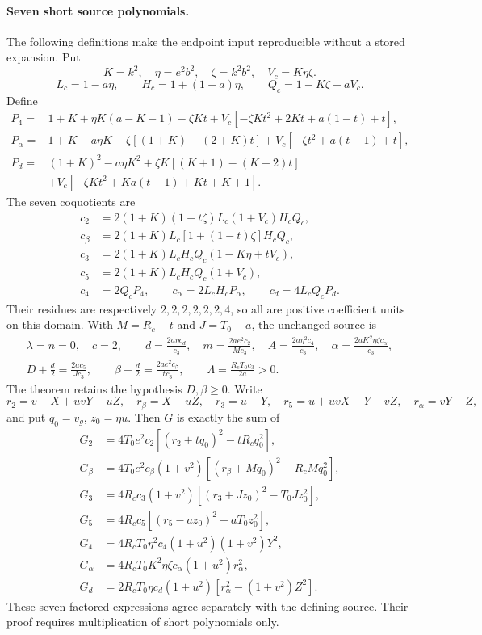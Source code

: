 \label{component:p7d4e5164e84a}
\paragraph{Seven short source polynomials.}
The following definitions make the endpoint input reproducible without a stored expansion. Put
\[
K=k^2,\quad \eta=e^2b^2,\quad\zeta=k^2b^2,\quad V_c=K\eta\zeta.
\]
\[
L_c=1-a\eta,\qquad H_c=1+(1-a)\eta,\qquad Q_c=1-K\zeta+aV_c.
\]
Define
\begin{align*}
P_4={}&1+K+\eta K(a-K-1)-\zeta Kt
 +V_c[-\zeta Kt^2+2Kt+a(1-t)+t],\\
P_\alpha={}&1+K-a\eta K+\zeta[(1+K)-(2+K)t]
 +V_c[-\zeta t^2+a(t-1)+t],\\
P_d={}&(1+K)^2-a\eta K^2+\zeta K[(K+1)-(K+2)t]\\
&+V_c[-\zeta Kt^2+Ka(t-1)+Kt+K+1].
\end{align*}
The seven coquotients are
\begin{align*}
c_2&=2(1+K)(1-t\zeta)L_c(1+V_c)H_cQ_c,\\
c_\beta&=2(1+K)L_c[1+(1-t)\zeta]H_cQ_c,\\
c_3&=2(1+K)L_cH_cQ_c(1-K\eta+tV_c),\\
c_5&=2(1+K)L_cH_cQ_c(1+V_c),\\
c_4&=2Q_cP_4,\qquad c_\alpha=2L_cH_cP_\alpha,
\qquad c_d=4L_cQ_cP_d.
\end{align*}
Their residues are respectively $2,2,2,2,2,2,4$, so all are positive coefficient units on this domain. With $M=R_c-t$ and $J=T_0-a$, the unchanged source is
\begin{gather*}
\lambda=n=0,\quad c=2,\qquad
d=\frac{2a\eta c_d}{c_3},\quad m=\frac{2ae^2c_2}{Mc_3},\quad
A=\frac{2a\eta^2c_4}{c_3},\quad
\alpha=\frac{2aK^2\eta\zeta c_\alpha}{c_3},\\
D+\frac d2=\frac{2ac_5}{Jc_3},\qquad
\beta+\frac d2=\frac{2ae^2c_\beta}{tc_3},\qquad
\Lambda=\frac{R_cT_0c_3}{2a}>0.
\end{gather*}
The theorem retains the hypothesis $D,\beta\ge0$. Write
\[
r_2=v-X+uvY-uZ,\quad r_\beta=X+uZ,\quad r_3=u-Y,
\quad r_5=u+uvX-Y-vZ,\quad r_\alpha=vY-Z,
\]
and put $q_0=v_g$, $z_0=\eta u$. Then $G$ is exactly the sum of
\begin{align*}
G_2&=4T_0e^2c_2[(r_2+tq_0)^2-tR_cq_0^2],\\
G_\beta&=4T_0e^2c_\beta(1+v^2)[(r_\beta+Mq_0)^2-R_cMq_0^2],\\
G_3&=4R_cc_3(1+v^2)[(r_3+Jz_0)^2-T_0Jz_0^2],\\
G_5&=4R_cc_5[(r_5-az_0)^2-aT_0z_0^2],\\
G_4&=4R_cT_0\eta^2c_4(1+u^2)(1+v^2)Y^2,\\
G_\alpha&=4R_cT_0K^2\eta\zeta c_\alpha(1+u^2)r_\alpha^2,\\
G_d&=2R_cT_0\eta c_d(1+u^2)[r_\alpha^2-(1+v^2)Z^2].
\end{align*}
These seven factored expressions agree separately with the defining source. Their proof requires multiplication of short polynomials only.



